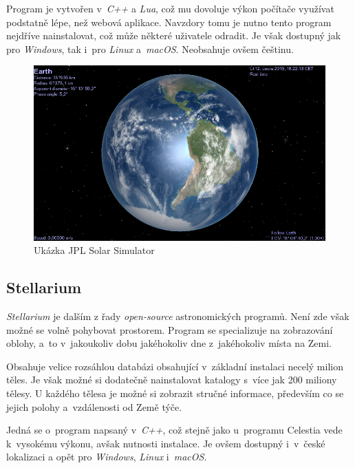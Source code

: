 \documentclass[a4paper,12pt]{article}
\begin{document}
Program je vytvořen v~\textit{C++} a \textit{Lua}, což mu dovoluje výkon počítače využívat podstatně lépe, než webová aplikace. Navzdory tomu je nutno tento program nejdříve nainstalovat, což může některé uživatele odradit. Je však dostupný jak pro \textit{Windows}, tak i~pro \textit{Linux} a~\textit{macOS}. Neobsahuje ovšem češtinu. 

\begin{figure}[H]
  \centering
  \includegraphics[width=450pt]{Images/Celestia.png}
  \caption[Ukázka programu Celestia]{Ukázka JPL Solar Simulator  \footnotemark[1]}
\end{figure}


\subsection{Stellarium}

\textit{Stellarium} je dalším z řady \textit{open-source} astronomických programů. Není zde však možné se volně pohybovat prostorem. Program se specializuje na zobrazování oblohy, a~to v~jakoukoliv dobu jakéhokoliv dne z~jakéhokoliv místa na Zemi.

Obsahuje velice rozsáhlou databázi obsahující v~základní instalaci necelý milion těles. Je však možné si dodatečně nainstalovat katalogy s~více jak 200 miliony tělesy. U každého tělesa je možné si zobrazit stručné informace, především co se jejich polohy a~vzdálenosti od Země týče.

Jedná se o~program napsaný v~\textit{C++}, což stejně jako u~programu Celestia vede k~vysokému výkonu, avšak nutnosti instalace. Je ovšem dostupný i~v~české lokalizaci a opět pro \textit{Windows}, \textit{Linux} i~\textit{macOS}.
\end{document}
